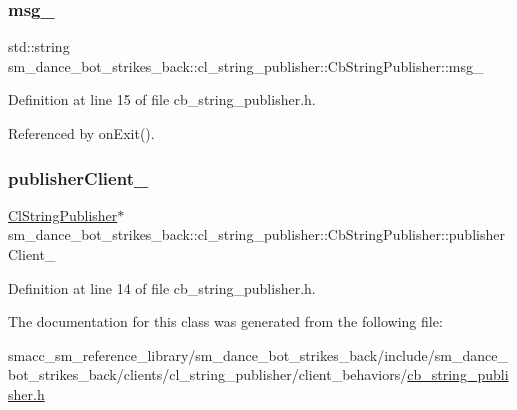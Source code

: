 \subsubsection{\texorpdfstring{msg\+\_\+}{msg\_}}
{\footnotesize\ttfamily std\+::string sm\+\_\+dance\+\_\+bot\+\_\+strikes\+\_\+back\+::cl\+\_\+string\+\_\+publisher\+::\+Cb\+String\+Publisher\+::msg\+\_\+}



Definition at line 15 of file cb\+\_\+string\+\_\+publisher.\+h.



Referenced by on\+Exit().

\mbox{\label{classsm__dance__bot__strikes__back_1_1cl__string__publisher_1_1CbStringPublisher_afdbdb3c725b013af9f30fc04d7ab458b}} 
\subsubsection{\texorpdfstring{publisher\+Client\+\_\+}{publisherClient\_}}
{\footnotesize\ttfamily \hyperlink{classsm__dance__bot__strikes__back_1_1cl__string__publisher_1_1ClStringPublisher}{Cl\+String\+Publisher}$\ast$ sm\+\_\+dance\+\_\+bot\+\_\+strikes\+\_\+back\+::cl\+\_\+string\+\_\+publisher\+::\+Cb\+String\+Publisher\+::publisher\+Client\+\_\+}



Definition at line 14 of file cb\+\_\+string\+\_\+publisher.\+h.



The documentation for this class was generated from the following file\+:\begin{DoxyCompactItemize}
\item 
smacc\+\_\+sm\+\_\+reference\+\_\+library/sm\+\_\+dance\+\_\+bot\+\_\+strikes\+\_\+back/include/sm\+\_\+dance\+\_\+bot\+\_\+strikes\+\_\+back/clients/cl\+\_\+string\+\_\+publisher/client\+\_\+behaviors/\hyperlink{sm__dance__bot__strikes__back_2include_2sm__dance__bot__strikes__back_2clients_2cl__string__publ2c65f6b51afab33732c07df2f6c50617}{cb\+\_\+string\+\_\+publisher.\+h}\end{DoxyCompactItemize}
